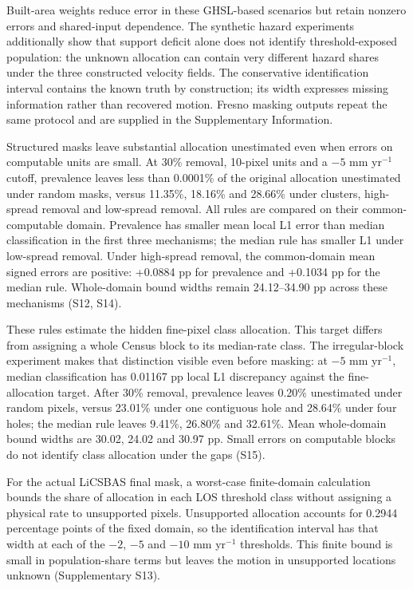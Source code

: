 \documentclass[pdflatex,sn-nature]{sn-jnl}
\begin{document}
Built-area weights reduce error in these GHSL-based scenarios but retain nonzero errors and shared-input dependence. The synthetic hazard experiments additionally show that support deficit alone does not identify threshold-exposed population: the unknown allocation can contain very different hazard shares under the three constructed velocity fields. The conservative identification interval contains the known truth by construction; its width expresses missing information rather than recovered motion. Fresno masking outputs repeat the same protocol and are supplied in the Supplementary Information.

Structured masks leave substantial allocation unestimated even when errors on computable units are small. At 30\% removal, 10-pixel units and a $-5$ mm yr$^{-1}$ cutoff, prevalence leaves less than 0.0001\% of the original allocation unestimated under random masks, versus 11.35\%, 18.16\% and 28.66\% under clusters, high-spread removal and low-spread removal. All rules are compared on their common-computable domain. Prevalence has smaller mean local L1 error than median classification in the first three mechanisms; the median rule has smaller L1 under low-spread removal. Under high-spread removal, the common-domain mean signed errors are positive: +0.0884 pp for prevalence and +0.1034 pp for the median rule. Whole-domain bound widths remain 24.12--34.90 pp across these mechanisms (S12, S14).

These rules estimate the hidden fine-pixel class allocation. This target differs from assigning a whole Census block to its median-rate class. The irregular-block experiment makes that distinction visible even before masking: at $-5$ mm yr$^{-1}$, median classification has 0.01167 pp local L1 discrepancy against the fine-allocation target. After 30\% removal, prevalence leaves 0.20\% unestimated under random pixels, versus 23.01\% under one contiguous hole and 28.64\% under four holes; the median rule leaves 9.41\%, 26.80\% and 32.61\%. Mean whole-domain bound widths are 30.02, 24.02 and 30.97 pp. Small errors on computable blocks do not identify class allocation under the gaps (S15).

For the actual LiCSBAS final mask, a worst-case finite-domain calculation bounds the share of allocation in each LOS threshold class without assigning a physical rate to unsupported pixels. Unsupported allocation accounts for 0.2944 percentage points of the fixed domain, so the identification interval has that width at each of the $-2$, $-5$ and $-10$ mm yr$^{-1}$ thresholds. This finite bound is small in population-share terms but leaves the motion in unsupported locations unknown (Supplementary S13).
\end{document}
